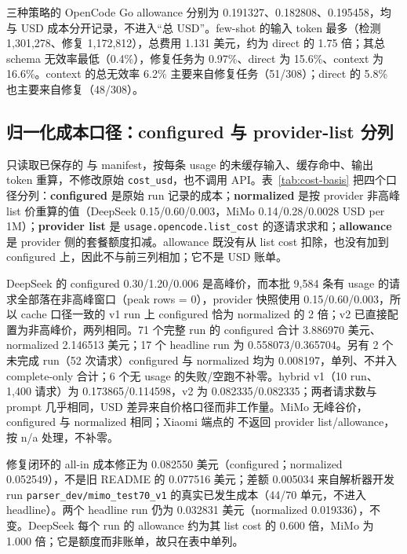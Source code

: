 \documentclass[conference]{IEEEtran}
\begin{document}
三种策略的 OpenCode Go allowance 分别为 0.191327、0.182808、0.195458，均与 USD 成本分开记录，不进入“总 USD”。few-shot 的输入 token 最多（检测 1{,}301{,}278、修复 1{,}172{,}812），总费用 1.131 美元，约为 direct 的 1.75 倍；其总 schema 无效率最低（0.4\%），修复任务为 0.97\%、direct 为 15.6\%、context 为 16.6\%。context 的总无效率 6.2\% 主要来自修复任务（51/308）；direct 的 5.8\% 也主要来自修复（48/308）。

\subsection{归一化成本口径：configured 与 provider-list 分列}
\label{sec:cost-normalized}
 只读取已保存的  与 manifest，按每条 usage 的未缓存输入、缓存命中、输出 token 重算，不修改原始 \texttt{cost\_usd}，也不调用 API。表~\ref{tab:cost-basis} 把四个口径分列：\textbf{configured} 是原始 run 记录的成本；\textbf{normalized} 是按 provider 非高峰 list 价重算的值（DeepSeek 0.15/0.60/0.003，MiMo 0.14/0.28/0.0028 USD per 1M）；\textbf{provider list} 是 \texttt{usage.opencode.list\_cost} 的逐请求求和；\textbf{allowance} 是 provider 侧的套餐额度扣减。allowance 既没有从 list cost 扣除，也没有加到 configured 上，因此不与前三列相加；它不是 USD 账单。

DeepSeek 的 configured 0.30/1.20/0.006 是高峰价，而本批 9{,}584 条有 usage 的请求全部落在非高峰窗口（peak rows = 0），provider 快照使用 0.15/0.60/0.003，所以 cache 口径一致的 v1 run 上 configured 恰为 normalized 的 2 倍；v2 已直接配置为非高峰价，两列相同。71 个完整 run 的 configured 合计 3.886970 美元、normalized 2.146513 美元；17 个 headline run 为 0.558073/0.365704。另有 2 个未完成 run（52 次请求）configured 与 normalized 均为 0.008197，单列、不并入 complete-only 合计；6 个无 usage 的失败/空跑不补零。hybrid v1（10 run、1{,}400 请求）为 0.173865/0.114598，v2 为 0.082335/0.082335；两者请求数与 prompt 几乎相同，USD 差异来自价格口径而非工作量。MiMo 无峰谷价，configured 与 normalized 相同；Xiaomi 端点的  不返回 provider list/allowance，按 n/a 处理，不补零。

修复闭环的 all-in 成本修正为 0.082550 美元（configured；normalized 0.052549），不是旧 README 的 0.077516 美元；差额 0.005034 来自解析器开发 run \texttt{parser\_dev/mimo\_test70\_v1} 的真实已发生成本（44/70 单元，不进入 headline）。两个 headline run 仍为 0.032831 美元（normalized 0.019336），不变。DeepSeek 每个 run 的 allowance 约为其 list cost 的 0.600 倍，MiMo 为 1.000 倍；它是额度而非账单，故只在表中单列。
\end{document}
